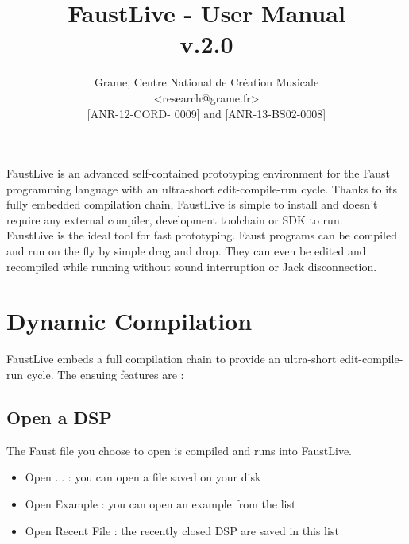 \documentclass[a4paper]{article}
\begin{document}
\title{FaustLive - User Manual \\ v.2.0}

\author{Grame, Centre National de Création Musicale\\
{\small <research@grame.fr>} \\
\vspace{2mm}
[ANR-12-CORD- 0009] and [ANR-13-BS02-0008]
}

\maketitle


\vspace{\fill}

FaustLive is an advanced self-contained prototyping environment for the Faust programming language with an ultra-short edit-compile-run cycle. Thanks to its fully embedded compilation chain, FaustLive is simple to install and doesn't require any external compiler, development toolchain or SDK to run. \\

FaustLive is the ideal tool for fast prototyping. Faust programs can be compiled and run on the fly by simple drag and drop. They can even be edited and recompiled while running without sound interruption or Jack disconnection.
\vspace{\fill}
\newpage
\tableofcontents

\newpage
\section{Dynamic Compilation}
FaustLive embeds a full compilation chain to provide an ultra-short edit-compile-run cycle.
The ensuing features are :

\subsection{Open a DSP}
The Faust file you choose to open is compiled and runs into FaustLive.
\begin{itemize}
\item Open ... : you can open a file saved on your disk
\item Open Example : you can open an example from the list
\item Open Recent File : the recently closed DSP are saved in this list
\end{itemize}
\end{document}
